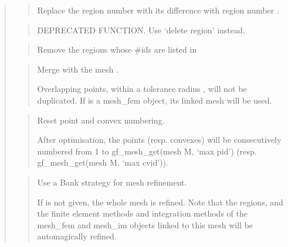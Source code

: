 \documentclass[a4paper,11pt,english]{sphinxmanual}
\begin{document}
\begin{quote}
\begin{quote}
\sphinxAtStartPar
Replace the region number  with its difference with region
number .
\end{quote}

\sphinxAtStartPar
{}
\begin{quote}

\sphinxAtStartPar
DEPRECATED FUNCTION. Use ‘delete region’ instead.
\end{quote}

\sphinxAtStartPar
{}
\begin{quote}

\sphinxAtStartPar
Remove the regions whose \#ids are listed in 
\end{quote}

\sphinxAtStartPar
{}
\begin{quote}

\sphinxAtStartPar
Merge with the mesh .

\sphinxAtStartPar
Overlapping points, within a tolerance radius , will not be
duplicated. If  is a mesh\_fem object, its linked mesh will be used.
\end{quote}

\sphinxAtStartPar
{}
\begin{quote}

\sphinxAtStartPar
Reset point and convex numbering.

\sphinxAtStartPar
After optimisation, the points (resp. convexes) will
be consecutively numbered from 1 to gf\_mesh\_get(mesh M, ‘max pid’)
(resp. gf\_mesh\_get(mesh M, ‘max cvid’)).
\end{quote}

\sphinxAtStartPar
{}
\begin{quote}

\sphinxAtStartPar
Use a Bank strategy for mesh refinement.

\sphinxAtStartPar
If  is not given, the whole mesh is refined. Note
that the regions, and the finite element methods and
integration methods of the mesh\_fem and mesh\_im objects linked
to this mesh will be automagically refined.
\end{quote}
\end{quote}
\end{document}
